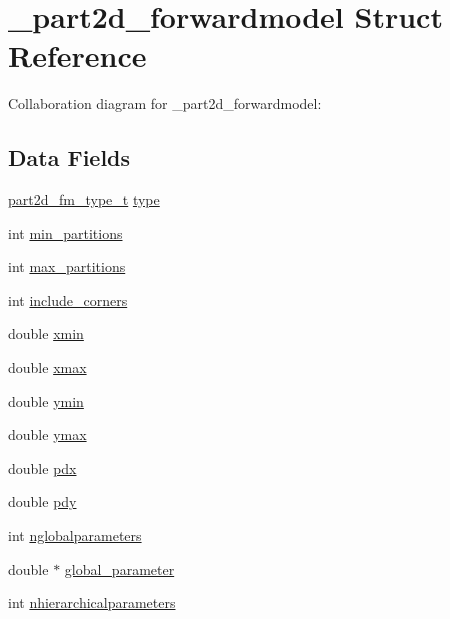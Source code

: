 \hypertarget{struct__part2d__forwardmodel}{}\section{\+\_\+part2d\+\_\+forwardmodel Struct Reference}
\label{struct__part2d__forwardmodel}


Collaboration diagram for \+\_\+part2d\+\_\+forwardmodel\+:
\subsection*{Data Fields}
\begin{DoxyCompactItemize}
\item 
\hyperlink{part2d__forwardmodel_8h_aec5ec1239a93116e1d2ae34957781f77}{part2d\+\_\+fm\+\_\+type\+\_\+t} \hyperlink{struct__part2d__forwardmodel_a47f7fe3ae2ce8606543e1b3abe43a425}{type}
\item 
int \hyperlink{struct__part2d__forwardmodel_a01d81ff50583385c1b8eb54fd7948ca7}{min\+\_\+partitions}
\item 
int \hyperlink{struct__part2d__forwardmodel_a6953c8f443d7eb5403c707f5f01d72dd}{max\+\_\+partitions}
\item 
int \hyperlink{struct__part2d__forwardmodel_a024ddffa3beae9186dfa395ca141ee54}{include\+\_\+corners}
\item 
double \hyperlink{struct__part2d__forwardmodel_ae3bd6a2449b7131eb256168237ad8a22}{xmin}
\item 
double \hyperlink{struct__part2d__forwardmodel_a5d7a37b791afeef33707fafd0ea06813}{xmax}
\item 
double \hyperlink{struct__part2d__forwardmodel_a6387788a27052e73e569e99343b0d5d8}{ymin}
\item 
double \hyperlink{struct__part2d__forwardmodel_ae3effad1ad4f653c9824cf4bca0aaa0b}{ymax}
\item 
double \hyperlink{struct__part2d__forwardmodel_a2559572a48c780ed7af8c0af0ae351e2}{pdx}
\item 
double \hyperlink{struct__part2d__forwardmodel_ad58a3cf954a91a53aad984d36b997800}{pdy}
\item 
int \hyperlink{struct__part2d__forwardmodel_a76da460c4d9df193a12e5bf0b85f6604}{nglobalparameters}
\item 
double $\ast$ \hyperlink{struct__part2d__forwardmodel_a1e733c2c95a579a0719709e06dd0b154}{global\+\_\+parameter}
\item 
int \hyperlink{struct__part2d__forwardmodel_acf218d2baa79617d40a7a1d655ffa422}{nhierarchicalparameters}

\end{DoxyCompactItemize}
